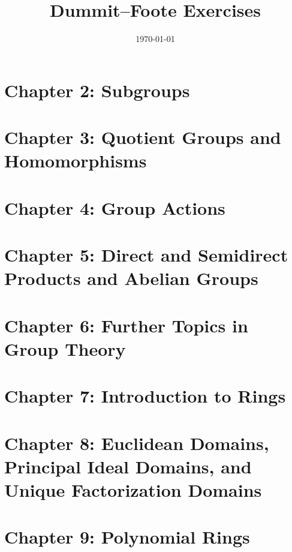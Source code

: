 \documentclass[11pt]{article}
\title{Dummit--Foote Exercises}
\date{\today}
\theoremstyle{definition}
\theoremstyle{remark}
\numberwithin{equation}{section}
\numberwithin{thm}{subsection}
\begin{document}
\maketitle



\section{Chapter 2: Subgroups}

\newpage

\section{Chapter 3: Quotient Groups and Homomorphisms}

\newpage

\section{Chapter 4: Group Actions}

\newpage

\section{Chapter 5: Direct and Semidirect Products and Abelian Groups}

\newpage

\section{Chapter 6: Further Topics in Group Theory}

\newpage

\section{Chapter 7: Introduction to Rings}

\newpage

\section{Chapter 8: Euclidean Domains, Principal Ideal Domains, and Unique Factorization Domains}

\newpage

\section{Chapter 9: Polynomial Rings}
\end{document}
